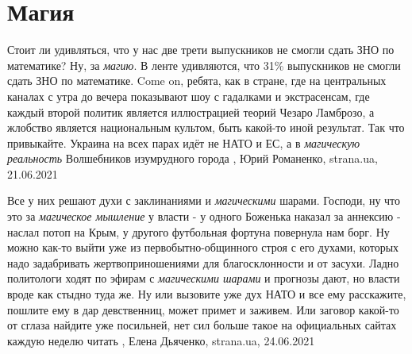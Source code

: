 
 
 
 
 
\chapter{Магия}
\label{sec:slova.magia}

Стоит ли удивляться, что у нас две трети выпускников не смогли сдать ЗНО по
математике?  Ну, за \emph{магию}.  В ленте удивляются, что 31\% выпускников не
смогли сдать ЗНО по математике. Come on, ребята, как в стране, где на
центральных каналах с утра до вечера показывают шоу с гадалками и экстрасенсам,
где каждый второй политик является иллюстрацией теорий Чезаро Ламброзо, а
жлобство является национальным культом, быть какой-то иной результат.  Так что
привыкайте. Украина на всех парах идёт не НАТО и ЕС, а в \emph{магическую
реальность} Волшебников изумрудного города
, 
Юрий Романенко, strana.ua, 21.06.2021

Все у них решают духи с заклинаниями и \emph{магическими} шарами.  Господи, ну что это
за \emph{магическое мышление} у власти - у одного Боженька наказал за аннексию -
наслал потоп на Крым, у другого футбольная фортуна повернула нам борг.  Ну
можно как-то выйти уже из первобытно-общинного строя с его духами, которых надо
задабривать жертвоприношениями для благосклонности и от засухи.  Ладно
политологи ходят по эфирам с \emph{магическими шарами} и прогнозы дают, но власти
вроде как стыдно туда же.  Ну или вызовите уже дух НАТО и все ему расскажите,
пошлите ему в дар девственниц, может примет и заживем. Или заговор какой-то от
сглаза найдите уже посильней, нет сил больше такое на официальных сайтах каждую
неделю читать
, 
Елена Дьяченко, strana.ua, 24.06.2021

